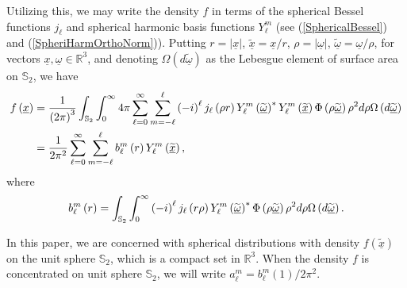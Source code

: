 \documentclass[preprint,11pt,a4paper]{elsarticle}
\begin{document}
Utilizing this, we may write the density $f$ in terms of the spherical
Bessel functions $j_{\ell}$ and spherical harmonic basis functions $%
Y_{\ell}^{m}$ (see (\ref{SphericalBessel}) and (\ref{SpheriHarmOrthoNorm})).
Putting $r=\left\vert \underline{x}\right\vert $, $\underline{\widetilde{x}}=%
\underline{x}/r$, $\rho=\left\vert \underline{\omega}\right\vert $, $%
\underline{\widetilde{\omega}}=\underline{\omega}/\rho$, for vectors $%
\underline{x},\underline{\omega}\in\mathbb{R}^{3}$, and denoting $%
\Omega\left( d\underline{\widetilde{\omega}}\right) $ as the Lebesgue
element of surface area on $\mathbb{S}_{2}$, we have 
\begin{align*}
f\left( \underline{x}\right) & =\frac{1}{\left( 2\pi\right) ^{3}}\int_{%
\mathbb{S}_{2}}\int_{0}^{\infty}4\pi\sum_{\ell=0}^{\infty}\sum_{m=-\ell
}^{\ell}\left( -i\right) ^{\ell}j_{\ell}\left( \rho r\right)
Y_{\ell}^{m}\left( \underline{\widetilde{\omega}}\right)
^{\ast}Y_{\ell}^{m}\left( \underline{\widetilde{x}}\right) \Phi\left( \rho%
\underline{\widetilde{\omega }}\right) \rho^{2}d\rho\Omega\left( d\underline{%
\widetilde{\omega}}\right) \\
& =\frac{1}{2\pi^{2}}\sum_{\ell=0}^{\infty}\sum_{m=-\ell}^{\ell}b_{\ell}^{m}%
\left( r\right) Y_{\ell}^{m}\left( \underline{\widetilde{x}}\right) ,
\end{align*}
where 
\begin{equation*}
b_{\ell}^{m}\left( r\right) =\int_{\mathbb{S}_{2}}\int_{0}^{\infty}\left(
-i\right) ^{\ell}j_{\ell}\left( r\rho\right) Y_{\ell}^{m}\left( \underline{%
\widetilde{\omega}}\right) ^{\ast}\Phi\left( \rho \underline{\widetilde{%
\omega}}\right) \rho^{2}d\rho\Omega\left( d\underline{\widetilde{\omega}}%
\right) .
\end{equation*}

In this paper, we are concerned with spherical distributions with density $%
f\left( \underline{\widetilde{x}}\right) $ on the unit sphere $\mathbb{S}%
_{2} $, which is a compact set in $\mathbb{R}^{3}$. When the density $f$ is
concentrated on unit sphere $\mathbb{S}_{2}$, we will write $a_{\ell
}^{m}=b_{\ell}^{m}\left( 1\right) /2\pi^{2}$.
\end{document}

